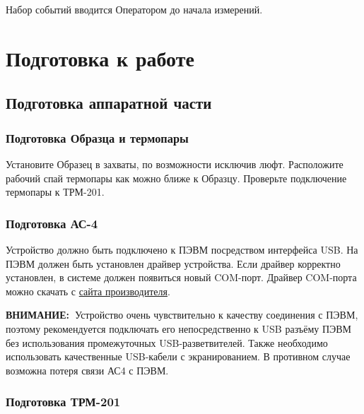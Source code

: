 \documentclass[12pt, a4paper, twocolumn]{report}
\newcommand{\IMPORTANT}{{\bf ВНИМАНИЕ:~}}
\begin{document}
Набор событий вводится Оператором до начала измерений.

\chapter{Подготовка к работе}

\section{Подготовка аппаратной части}

\subsection{Подготовка Образца и термопары}

Установите Образец в захваты, по возможности исключив люфт. Расположите рабочий спай термопары как можно ближе к Образцу. Проверьте подключение термопары к ТРМ-201.

\subsection{Подготовка АС-4}

Устройство должно быть подключено к ПЭВМ посредством интерфейса USB. На ПЭВМ должен быть установлен драйвер устройства. Если драйвер корректно установлен, в системе должен появиться новый COM-порт. Драйвер COM-порта можно скачать с \href{http://www.owen.ru/catalog/avtomaticheskij_preobrazovatel_interfejsov_usb_rs_485_owen_as4/opisanie}{сайта производителя}.

\IMPORTANT Устройство очень чувствительно к качеству соединения с ПЭВМ, поэтому рекомендуется подключать его непосредственно к USB разъёму ПЭВМ без использования промежуточных USB-разветвителей. Также необходимо использовать качественные USB-кабели с экранированием. В противном случае возможна потеря связи АС4 с ПЭВМ.

\subsection{Подготовка ТРМ-201}
\end{document}
